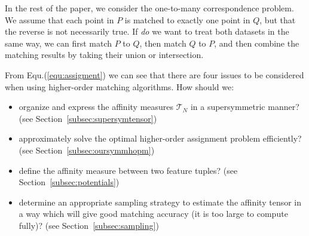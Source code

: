 In the rest of the paper, we consider the one-to-many correspondence problem.
We assume that each point in $P$ is matched to exactly one point in $Q$, but that the reverse is not necessarily true.
If \emph{do} we want to treat both datasets in the same way,
we can first match $P$ to $Q$, then match $Q$ to $P$, and then combine the matching results by taking their union or intersection.

From Equ.(\ref{equ:assigment}) we can see that there are four issues to be considered when using higher-order matching algorithms. How should we:
\begin{itemize}
\item organize and express the affinity measures $\mathcal{T}_N$ in a supersymmetric manner? (see Section~\ref{subsec:supersymtensor})
\item approximately solve the optimal higher-order assignment problem efficiently? (see Section~\ref{subsec:oursymmhopm})
\item define the affinity measure between two feature tuples? (see Section~\ref{subsec:potentials})
\item determine an appropriate sampling strategy to estimate the affinity tensor in a way which will give good matching accuracy (it is too large to compute fully)? (see Section~\ref{subsec:sampling})
\end{itemize}



